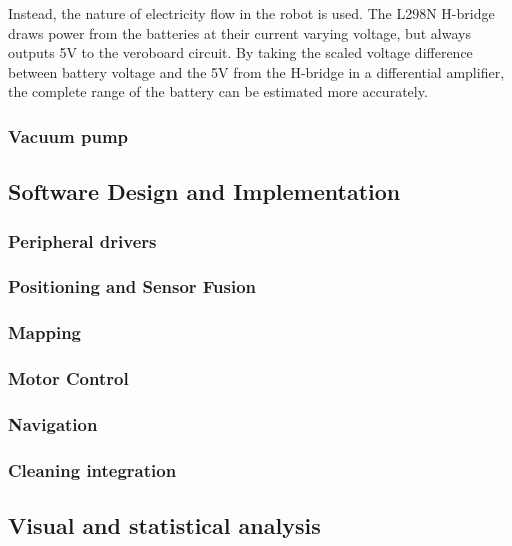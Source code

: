 Instead, the nature of electricity flow in the robot is used. The L298N H-bridge draws power from the batteries at their current varying voltage, but always outputs 5V to the veroboard circuit. By taking the scaled voltage difference between battery voltage and the 5V from the H-bridge in a differential amplifier, the complete range of the battery can be estimated more accurately.

\subsubsection{Vacuum pump}
\label{sec:vacuum}

\subsection{Software Design and Implementation}

\subsubsection{Peripheral drivers}
\label{sec:periph}

\subsubsection{Positioning and Sensor Fusion}
\label{sec:position}

\subsubsection{Mapping}
\label{sec:mapping}

\subsubsection{Motor Control}
\label{sec:control}

\subsubsection{Navigation}
\label{sec:navigation}



\subsubsection{Cleaning integration}
\label{sec:cleaning}

\subsection{Visual and statistical analysis}
\label{sec:stats}

